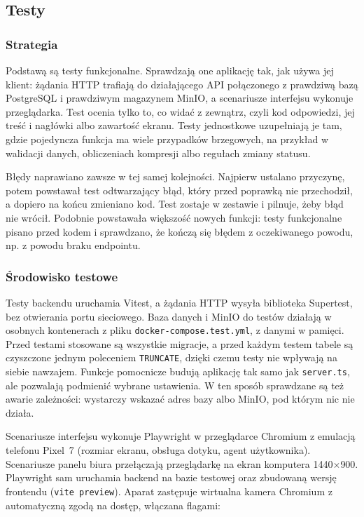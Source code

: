 \subsection{Testy}
\label{sec:testy}

\subsubsection{Strategia}

Podstawą są testy funkcjonalne. Sprawdzają one aplikację tak, jak używa jej
klient: żądania HTTP trafiają do działającego API połączonego z prawdziwą bazą
PostgreSQL i prawdziwym magazynem MinIO, a scenariusze interfejsu wykonuje
przeglądarka. Test ocenia tylko to, co widać z zewnątrz, czyli kod odpowiedzi,
jej treść i nagłówki albo zawartość ekranu. Testy jednostkowe uzupełniają je
tam, gdzie pojedyncza funkcja ma wiele przypadków brzegowych, na przykład
w walidacji danych, obliczeniach kompresji albo regułach zmiany statusu.

Błędy naprawiano zawsze w tej samej kolejności. Najpierw ustalano przyczynę,
potem powstawał test odtwarzający błąd, który przed poprawką nie przechodził,
a dopiero na końcu zmieniano kod. Test zostaje w zestawie i pilnuje, żeby błąd
nie wrócił. Podobnie powstawała większość nowych funkcji: testy funkcjonalne
pisano przed kodem i sprawdzano, że kończą się błędem z oczekiwanego powodu,
np. z powodu braku endpointu.

\subsubsection{Środowisko testowe}

Testy backendu uruchamia Vitest, a żądania HTTP wysyła biblioteka Supertest,
bez otwierania portu sieciowego. Baza danych i MinIO do testów działają
w osobnych kontenerach z pliku \texttt{docker-compose.test.yml}, z danymi
w pamięci. Przed testami stosowane są wszystkie migracje, a przed każdym testem
tabele są czyszczone jednym poleceniem \texttt{TRUNCATE}, dzięki czemu testy
nie wpływają na siebie nawzajem. Funkcje pomocnicze budują aplikację tak samo
jak \texttt{server.ts}, ale pozwalają podmienić wybrane ustawienia. W ten sposób
sprawdzane są też awarie zależności: wystarczy wskazać adres bazy albo MinIO,
pod którym nic nie działa.

Scenariusze interfejsu wykonuje Playwright w przeglądarce Chromium z emulacją
telefonu Pixel~7 (rozmiar ekranu, obsługa dotyku, agent użytkownika).
Scenariusze panelu biura przełączają przeglądarkę na ekran komputera
1440$\times$900. Playwright sam uruchamia backend na bazie testowej oraz
zbudowaną wersję frontendu (\texttt{vite preview}). Aparat zastępuje wirtualna
kamera Chromium z automatyczną zgodą na dostęp, włączana flagami:

